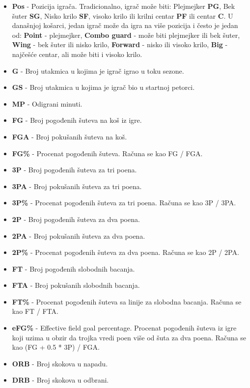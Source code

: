 \documentclass[a4paper]{article}
\begin{document}
\begin{itemize}
	\item \textbf{Pos} - Pozicija igrača. Tradicionalno, igrač može biti: Plejmejker \textbf{PG}, Bek šuter \textbf{SG}, Nisko krilo \textbf{SF}, visoko krilo ili krilni centar \textbf{PF} ili centar \textbf{C}. U današnjoj košarci, jedan igrač može da igra na više pozicija i često je jedan od: \textbf{Point} - plejmejker, \textbf{Combo guard} - može biti plejmejker ili bek šuter, \textbf{Wing} - bek šuter ili nisko krilo, \textbf{Forward} - nisko ili visoko krilo, \textbf{Big} - najčešće centar, ali može biti i visoko krilo.
    \item \textbf{G} - Broj utakmica u kojima je igrač igrao u toku sezone.
    \item \textbf{GS} - Broj utakmica u kojima je igrač bio u startnoj petorci.
    \item \textbf{MP} - Odigrani minuti.
    \item \textbf{FG} - Broj pogođenih šuteva na koš iz igre.
    \item \textbf{FGA} - Broj pokušanih šuteva na koš.
    \item \textbf{FG\%} - Procenat pogođenih šuteva. Računa se kao FG / FGA.
    \item \textbf{3P} - Broj pogođenih šuteva za tri poena.
    \item \textbf{3PA} - Broj pokušanih šuteva za tri poena.
    \item \textbf{3P\%} - Procenat pogođenih šuteva za tri poena. Računa se kao 3P / 3PA.
    \item \textbf{2P} - Broj pogođenih šuteva za dva poena.
    \item \textbf{2PA} - Broj pokušanih šuteva za dva poena.
    \item \textbf{2P\%} - Procenat pogođenih šuteva za dva poena. Računa se kao 2P / 2PA.
    \item \textbf{FT} - Broj pogođenih slobodnih bacanja.
    \item \textbf{FTA} - Broj pokušanih slobodnih bacanja.
    \item \textbf{FT\%} - Procenat pogođenih šuteva sa linije za slobodna bacanja. Računa se kao FT / FTA.
    \item \textbf{eFG\%} - Effective field goal percentage. Procenat pogođenih šuteva iz igre koji uzima u obzir da trojka vredi poen više od šuta za dva poena. Računa se kao (FG + 0.5 * 3P) / FGA.
    \item \textbf{ORB} - Broj skokova u napadu.
    \item \textbf{DRB} - Broj skokova u odbrani.

\end{itemize}
\end{document}
